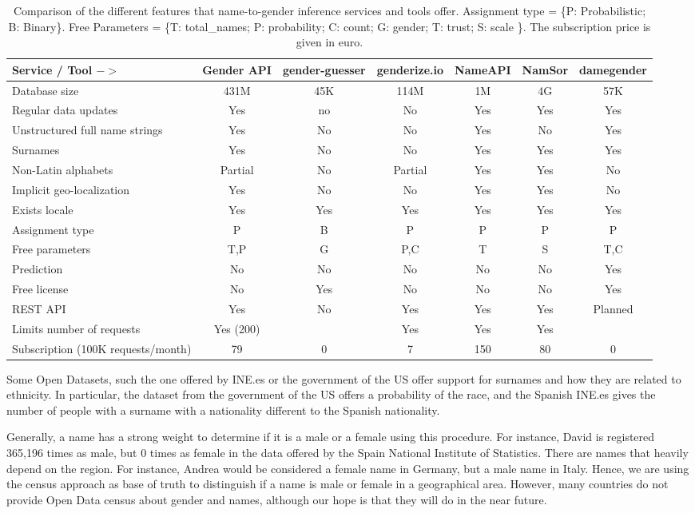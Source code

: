 \documentclass[a4paper]{article}
\def\infinity{\rotatebox{90}{8}}
\begin{document}
\begin{table*}[ht]
\footnotesize
\begin{tabular}[]{lcccccc}
\hline
Service / Tool $->$ & Gender API & gender-guesser & genderize.io & NameAPI & NamSor & damegender\tabularnewline
\hline
Database size & 431M & 45K & 114M & 1M & 4G & 57K \tabularnewline
Regular data updates & Yes & no & No & Yes & Yes & Yes\tabularnewline
Unstructured full name strings & Yes & No & No & Yes & No & Yes\tabularnewline
Surnames & Yes & No & No & Yes & Yes & Yes\tabularnewline
Non-Latin alphabets & Partial & No & Partial & Yes & Yes & No\tabularnewline
Implicit geo-localization & Yes & No & No & Yes & Yes & No\tabularnewline
Exists locale & Yes & Yes & Yes & Yes & Yes & Yes\tabularnewline
Assignment type & P & B & P & P & P & P \tabularnewline
Free parameters & T,P & G & P,C & T & S & T,C\tabularnewline
Prediction & No & No & No & No & No & Yes\tabularnewline
Free license & No & Yes & No & No & No & Yes\tabularnewline
REST API & Yes & No & Yes & Yes & Yes & Planned\tabularnewline
Limits number of requests & Yes (200) & \infinity & Yes & Yes & Yes & \infinity \tabularnewline
Subscription (100K requests/month)	 & 79 & 0 & 7 & 150 & 80 & 0 \tabularnewline
\hline
\end{tabular}
\caption{Comparison of the different features that name-to-gender inference services and tools offer. Assignment type = \{P: Probabilistic; B: Binary\}. Free Parameters = \{T: total\_names; P: probability; C: count; G: gender; T: trust; S: scale \}. The subscription price is given in euro.}
\vspace{0.3cm}
\label{table:comparison}
\end{table*}


Some Open Datasets, such the one offered by INE.es or the government of the US offer support for surnames and how they are related to ethnicity. 
In particular, the dataset from the government of the US offers a probability of the race, and the Spanish INE.es gives the number of people with a surname with a nationality different to the Spanish nationality.

Generally, a name has a strong weight to determine if it is a male or a female using this procedure.
For instance, David is registered 365,196 times as male, but 0 times as female in the data offered by the Spain National Institute of Statistics.
There are names that heavily depend on the region. 
For instance, Andrea would be considered a female name in Germany, but a male name in Italy.
Hence, we are using the census approach as base of truth to distinguish if a name is male or female in a geographical area. 
However, many countries do not provide Open Data census about gender and names, although our hope is that they will do in the near future.
\end{document}
